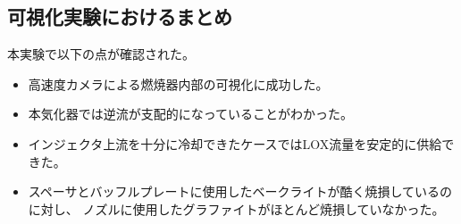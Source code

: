 \subsection{可視化実験におけるまとめ}
本実験で以下の点が確認された。
\begin{itemize}
\item 高速度カメラによる燃焼器内部の可視化に成功した。
\item 本気化器では逆流が支配的になっていることがわかった。
\item インジェクタ上流を十分に冷却できたケースではLOX流量を安定的に供給できた。
\item スペーサとバッフルプレートに使用したベークライトが酷く焼損しているのに対し、
ノズルに使用したグラファイトがほとんど焼損していなかった。
\end{itemize}
